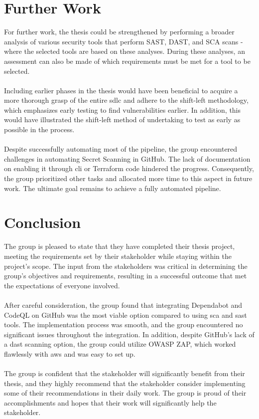 \section{Further Work}
For further work, the thesis could be strengthened by performing a broader analysis of various security tools that perform SAST, DAST, and SCA scans -  where the selected tools are based on these analyses. During these analyses, an assessment can also be made of which requirements must be met for a tool to be selected. 
\\~\\
Including earlier phases in the thesis would have been beneficial to acquire a more thorough grasp of the entire \acrlong{sdlc} and adhere to the shift-left methodology, which emphasizes early testing to find vulnerabilities earlier. In addition, this would have illustrated the shift-left method of undertaking to test as early as possible in the process.  
\\~\\
Despite successfully automating most of the pipeline, the group encountered challenges in automating Secret Scanning in GitHub. The lack of documentation on enabling it through \acrshort{cli} or Terraform code hindered the progress. Consequently, the group prioritized other tasks and allocated more time to this aspect in future work. The ultimate goal remains to achieve a fully automated pipeline. 

\section{Conclusion}
The group is pleased to state that they have completed their thesis project, meeting the requirements set by their stakeholder while staying within the project's scope. The input from the stakeholders was critical in determining the group's objectives and requirements, resulting in a successful outcome that met the expectations of everyone involved.
\\~\\
After careful consideration, the group found that integrating Dependabot and CodeQL on GitHub was the most viable option compared to using \acrshort{sca} and \acrshort{sast} tools. The implementation process was smooth, and the group encountered no significant issues throughout the integration. In addition, despite GitHub's lack of a \acrshort{dast} scanning option, the group could utilize OWASP ZAP, which worked flawlessly with \acrshort{aws} and was easy to set up.
\\~\\
The group is confident that the stakeholder will significantly benefit from their thesis, and they highly recommend that the stakeholder consider implementing some of their recommendations in their daily work. The group is proud of their accomplishments and hopes that their work will significantly help the stakeholder.
